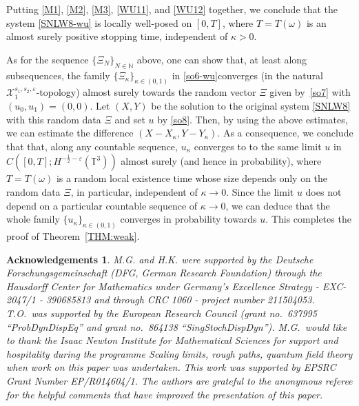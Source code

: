 \documentclass[%
11pt,  reqno]{amsart}
\newcommand{\1}{\hspace{0.2mm}\text{I}\hspace{0.2mm}}
\newcommand{\T}{\mathbb{T}}
\newcommand{\eps}{\varepsilon}
\newcommand{\kk}{\kappa}
\renewcommand{\o}{\omega}
\newcommand{\N}{\mathbb{N}}
\newtheorem*{ackno}{Acknowledgements}
\numberwithin{equation}{section}
\numberwithin{theorem}{section}
\begin{document}
Putting \eqref{M1}, \eqref{M2},  \eqref{M3}, 
\eqref{WU11}, and \eqref{WU12} together, 
we conclude that the system \eqref{SNLW8-wu}
is locally well-posed on $[0, T]$, 
where  $T = T(\o)$
is an  almost surely positive stopping time, 
independent of $\kk > 0$.






 As for the sequence $\{\Xi_N\}_{N\in \N}$ above, 
 one can show that, at least along subsequences, 
 the family $\{\Xi_\kk\}_{\kk\in(0,1)}$ in \eqref{so6-wu}converges (in the natural 
 $\mathcal{X}^{s_1, s_2,  \eps}_1$-topology)  almost surely 
 towards the random vector $\Xi$ given by~\eqref{so7} with $(u_0,u_1)=(0,0)$.
Let $(X, Y)$ be the solution to the original system \eqref{SNLW8}
with this random data  $\Xi$
and set $u$ by \eqref{so8}.
Then, by using the above estimates, 
we can estimate the difference $(X - X_\kk, Y - Y_\kk)$.
As a consequence, 
we conclude that that, along any countable sequence, 
 $u_\kk$ converges to 
to the same limit $u$ 
in $C([0,T];H^{-\frac12 -\eps}(\T^3))$
almost surely (and hence in probability), 
where $T = T(\o)$ is a random local existence time
 whose size depends only on the random data $\Xi$, 
in particular, independent of $\kk \to 0$.
Since the limit $u$ does not depend on a particular countable sequence of $\kk \to 0$, 
we can deduce that the whole family $\{u_\kk\}_{\kk \in (0, 1)}$ converges in probability towards $u$.
This completes the proof of Theorem~\ref{THM:weak}.






\begin{ackno}\rm
M.G. and H.K. were supported by the Deutsche Forschungsgemeinschaft (DFG, German Research Foundation) through the Hausdorff Center for Mathematics under Germany's Excellence Strategy - EXC-2047/1 - 390685813 and through CRC 1060 - project number 211504053.
%
T.O.~was supported by the European Research Council (grant no.~637995 ``ProbDynDispEq'' and grant no.~864138 ``SingStochDispDyn'').
M.G.~would like to thank the Isaac Newton Institute for Mathematical Sciences for support and hospitality during the programme Scaling limits, rough paths, quantum field theory when work on this paper was undertaken.  This work was supported by EPSRC Grant Number EP/R014604/1.
The authors are grateful to the anonymous referee for the helpful comments that have improved the presentation of this paper.

\end{ackno}
\end{document}
